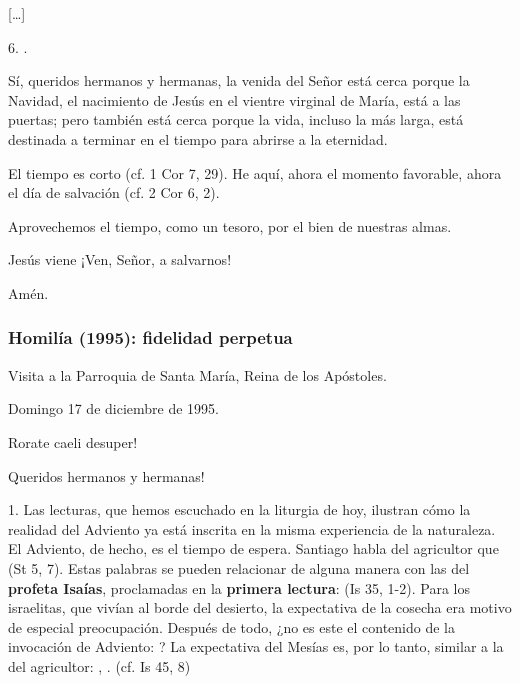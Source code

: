 {[}\ldots{}{]}

6. .

Sí, queridos hermanos y hermanas, la venida del Señor está cerca porque la Navidad, el nacimiento de Jesús en el vientre virginal de María, está a las puertas; pero también está cerca porque la vida, incluso la más larga, está destinada a terminar en el tiempo para abrirse a la eternidad.

El tiempo es corto (cf. 1 Cor 7, 29). He aquí, ahora el momento favorable, ahora el día de salvación (cf. 2 Cor 6, 2).

Aprovechemos el tiempo, como un tesoro, por el bien de nuestras almas.

Jesús viene ¡Ven, Señor, a salvarnos!

Amén.

\subsubsection{Homilía (1995): fidelidad perpetua}

Visita a la Parroquia de Santa María, Reina de los Apóstoles.

Domingo 17 de diciembre de 1995.

Rorate caeli desuper!

Queridos hermanos y hermanas!

1. Las lecturas, que hemos escuchado en la liturgia de hoy, ilustran cómo la realidad del Adviento ya está inscrita en la misma experiencia de la naturaleza. El Adviento, de hecho, es el tiempo de espera. Santiago habla del agricultor que  (St 5, 7). Estas palabras se pueden relacionar de alguna manera con las del \textbf{profeta Isaías}, proclamadas en la \textbf{primera lectura}:  (Is 35, 1-2). Para los israelitas, que vivían al borde del desierto, la expectativa de la cosecha era motivo de especial preocupación. Después de todo, ¿no es este el contenido de la invocación de Adviento: ? La expectativa del Mesías es, por lo tanto, similar a la del agricultor: , . (cf. Is 45, 8)

